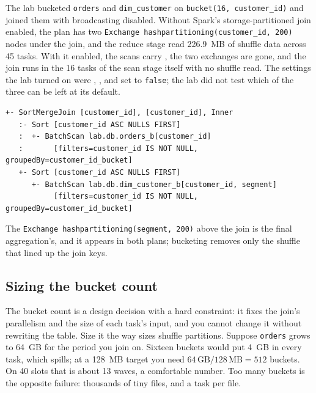 The lab bucketed \texttt{orders} and \texttt{dim\_customer} on
\texttt{bucket(16, customer\_id)} and joined them with broadcasting disabled.
Without Spark's storage-partitioned join enabled, the plan has two
\texttt{Exchange hashpartitioning(customer\_id, 200)} nodes under the join, and
the reduce stage read 226.9~MB of shuffle data across 45 tasks. With it enabled,
the scans carry , the two exchanges are
gone, and the join runs in the 16 tasks of the scan stage itself with no shuffle
read. The settings the lab turned on were
,
, and
 set to \texttt{false}; the
lab did not test which of the three can be left at its default.

\begin{lstlisting}[language=text,numbers=none,style=plan,caption={A join over two bucketed Iceberg tables: no \texttt{Exchange} under the join (\texttt{EXPLAIN}, trimmed)},captionpos=b,label=lst:pruning-bucketed-plan]
+- SortMergeJoin [customer_id], [customer_id], Inner
   :- Sort [customer_id ASC NULLS FIRST]
   :  +- BatchScan lab.db.orders_b[customer_id]
   :       [filters=customer_id IS NOT NULL, groupedBy=customer_id_bucket]
   +- Sort [customer_id ASC NULLS FIRST]
      +- BatchScan lab.db.dim_customer_b[customer_id, segment]
           [filters=customer_id IS NOT NULL, groupedBy=customer_id_bucket]
\end{lstlisting}

The \texttt{Exchange hashpartitioning(segment, 200)} above the join is the final
aggregation's, and it appears in both plans; bucketing removes only the shuffle
that lined up the join keys.

\subsection{Sizing the bucket count}

The bucket count is a design decision with a hard constraint: it fixes the join's
parallelism and the size of each task's input, and you cannot change it without
rewriting the table. Size it the way  sizes shuffle
partitions. Suppose \texttt{orders} grows to 64~GB for the period you join on.
Sixteen buckets would put 4~GB in every task, which spills; at a 128~MB target
you need $64\,\text{GB} / 128\,\text{MB} = 512$ buckets. On 40 slots that is
about 13 waves, a comfortable number. Too many buckets is the opposite
failure: thousands of tiny files, and a task per file.

